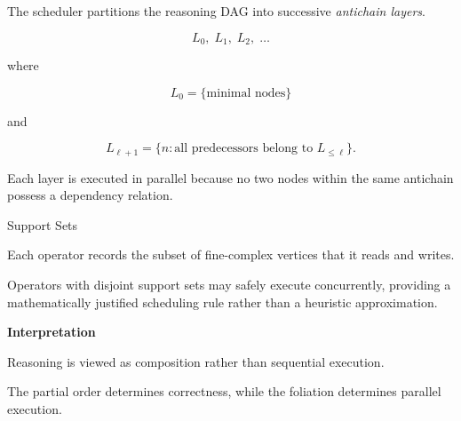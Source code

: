 
\begin{highlightbox}


\BodyFont

The scheduler partitions the reasoning DAG into successive
\emph{antichain layers}.

\[
L_0,\;
L_1,\;
L_2,\;
\ldots
\]

where

\[
L_0
=
\{\text{minimal nodes}\}
\]

and

\[
L_{\ell+1}
=
\{
n:
\text{all predecessors belong to }
L_{\le\ell}
\}.
\]

Each layer is executed in parallel because no two nodes within the same
antichain possess a dependency relation.

\end{highlightbox}


\begin{mosbox}{Support Sets}

\BodyFont

Each operator records the subset of fine-complex vertices that it reads
and writes.

Operators with disjoint support sets may safely execute concurrently,
providing a mathematically justified scheduling rule rather than a
heuristic approximation.

\end{mosbox}


\begin{remarkbox}

\BodyFont

\textbf{Interpretation}

Reasoning is viewed as composition rather than sequential execution.

The partial order determines correctness, while the foliation determines
parallel execution.

\end{remarkbox}